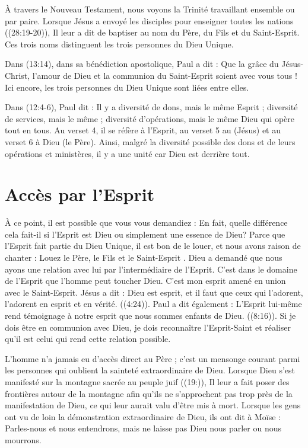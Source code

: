 À travers le Nouveau Testament, nous voyons la Trinité travaillant ensemble ou par paire. Lorsque Jésus a envoyé les disciples pour enseigner toutes les nations ((28:19-20)), Il leur a dit de baptiser au nom du Père, du Fils et du Saint-Esprit. Ces trois noms distinguent les trois personnes du Dieu Unique.

Dans (13:14), dans sa bénédiction apostolique, Paul a dit : \og Que la grâce du \Seigneur{} Jésus-Christ, l'amour de Dieu et la communion du Saint-Esprit soient avec vous tous ! \fg{} Ici encore, les trois personnes du Dieu Unique sont liées entre elles.

Dans (12:4-6), Paul dit : \og Il y a diversité de dons, mais le même Esprit ; diversité de services, mais le même \Seigneur{} ; diversité d'opérations, mais le même Dieu qui opère tout en tous. \fg{} Au verset 4, il se réfère à l'Esprit, au verset 5 au \Seigneur{} (Jésus) et au verset 6 à Dieu (le Père). Ainsi, malgré la diversité possible des dons et de leurs opérations et ministères, il y a une unité car Dieu est derrière tout.


\section{Accès par l'Esprit}

À ce point, il est possible que vous vous demandiez : \og En fait, quelle différence cela fait-il si l'Esprit est Dieu ou simplement une essence de Dieu? \fg{} Parce que l'Esprit fait partie du Dieu Unique, il est bon de le louer, et nous avons raison de chanter : \og Louez le Père, le Fils et le Saint-Esprit \fg{}. Dieu a demandé que nous ayons une relation avec lui par l'intermédiaire de l'Esprit. C'est dans le domaine de l'Esprit que l'homme peut toucher Dieu. C'est mon esprit amené en union avec le Saint-Esprit. Jésus a dit : \og Dieu est esprit, et il faut que ceux qui l'adorent, l'adorent en esprit et en vérité. \fg{} ((4:24)). Paul a dit également : \og L'Esprit lui-même rend témoignage à notre esprit que nous sommes enfants de Dieu.  \fg{} ((8:16)). Si je dois être en communion avec Dieu, je dois reconnaître l'Esprit-Saint et réaliser qu'il est celui qui rend cette relation possible.

L'homme n'a jamais eu d'accès direct au Père ; c'est un mensonge courant parmi les personnes qui oublient la sainteté extraordinaire de Dieu. Lorsque Dieu s'est manifesté sur la montagne sacrée au peuple juif ((19:)), Il leur a fait poser des frontières autour de la montagne afin qu'ils ne s'approchent pas trop près de la manifestation de Dieu, ce qui leur aurait valu d'être mis à mort. Lorsque les gens ont vu de loin la démonstration extraordinaire de Dieu, ils ont dit à Moïse : \og Parles-nous et nous entendrons, mais ne laisse pas Dieu nous parler ou nous mourrons. \fg{}

